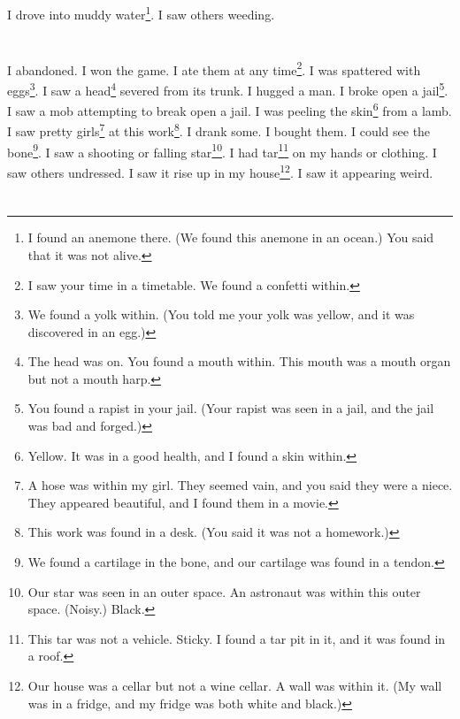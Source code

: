 \documentclass[12pt]{book}
\begin{document}
\chapter{}

I drove into muddy water\footnote{I found an anemone there. (We found this anemone in an ocean.) You said that it was not alive.}. I saw others weeding.

\chapter{}

I abandoned. I won the game. I ate them at any time\footnote{I saw your time in a timetable. We found a confetti within.}. I was spattered with eggs\footnote{We found a yolk within. (You told me your yolk was yellow, and it was discovered in an egg.)}. I saw a head\footnote{The head was on. You found a mouth within. This mouth was a mouth organ but not a mouth harp.} severed from its trunk. I hugged a man. I broke open a jail\footnote{You found a rapist in your jail. (Your rapist was seen in a jail, and the jail was bad and forged.)}. I saw a mob attempting to break open a jail. I was peeling the skin\footnote{Yellow. It was in a good health, and I found a skin within.} from a lamb. I saw pretty girls\footnote{A hose was within my girl. They seemed vain, and you said they were a niece. They appeared beautiful, and I found them in a movie.} at this work\footnote{This work was found in a desk. (You said it was not a homework.)}. I drank some. I bought them. I could see the bone\footnote{We found a cartilage in the bone, and our cartilage was found in a tendon.}. I saw a shooting or falling star\footnote{Our star was seen in an outer space. An astronaut was within this outer space. (Noisy.) Black.}. I had tar\footnote{This tar was not a vehicle. Sticky. I found a tar pit in it, and it was found in a roof.} on my hands or clothing. I saw others undressed. I saw it rise up in my house\footnote{Our house was a cellar but not a wine cellar. A wall was within it. (My wall was in a fridge, and my fridge was both white and black.)}. I saw it appearing weird. 



\chapter{}
\end{document}
